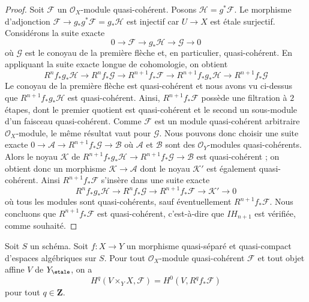 \begin{proof}
\medskip\noindent
Soit $\mathcal{F}$ un $\mathcal{O}_X$-module quasi-cohérent.
Posons $\mathcal{H} = g^*\mathcal{F}$. Le morphisme d'adjonction
$\mathcal{F} \to g_*g^*\mathcal{F} = g_*\mathcal{H}$ est injectif
car $U \to X$ est étale surjectif. Considérons la suite exacte
$$
0 \to \mathcal{F} \to g_*\mathcal{H} \to \mathcal{G} \to 0
$$
où $\mathcal{G}$ est le conoyau de la première flèche et, en particulier,
quasi-cohérent. En appliquant la suite exacte longue de cohomologie, on obtient
$$
R^nf_*g_*\mathcal{H} \to
R^nf_*\mathcal{G} \to
R^{n + 1}f_*\mathcal{F} \to
R^{n + 1}f_*g_*\mathcal{H} \to
R^{n + 1}f_*\mathcal{G}
$$
Le conoyau de la première flèche est quasi-cohérent et
nous avons vu ci-dessus que $R^{n + 1}f_*g_*\mathcal{H}$ est quasi-cohérent.
Ainsi, $R^{n + 1}f_*\mathcal{F}$ possède une filtration à $2$ étapes,
dont le premier quotient est quasi-cohérent et le second un sous-module d'un
faisceau quasi-cohérent. Comme $\mathcal{F}$ est un module quasi-cohérent arbitraire
$\mathcal{O}_X$-module, le même résultat vaut pour $\mathcal{G}$.
Nous pouvons donc choisir une suite exacte
$0 \to \mathcal{A} \to R^{n + 1}f_*\mathcal{G} \to \mathcal{B}$
où $\mathcal{A}$ et $\mathcal{B}$ sont des $\mathcal{O}_Y$-modules quasi-cohérents.
Alors le noyau $\mathcal{K}$ de
$R^{n + 1}f_*g_*\mathcal{H} \to R^{n + 1}f_*\mathcal{G}
\to \mathcal{B}$ est quasi-cohérent ; on obtient donc un morphisme
$\mathcal{K} \to \mathcal{A}$ dont le noyau $\mathcal{K}'$ est
également quasi-cohérent. Ainsi $R^{n + 1}f_*\mathcal{F}$ s'insère dans une suite
exacte
$$
R^nf_*g_*\mathcal{H} \to
R^nf_*\mathcal{G} \to
R^{n + 1}f_*\mathcal{F} \to \mathcal{K}' \to 0
$$
où tous les modules sont quasi-cohérents, sauf éventuellement $R^{n + 1}f_*\mathcal{F}$.
Nous concluons que $R^{n + 1}f_*\mathcal{F}$ est quasi-cohérent, c'est-à-dire que
$IH_{n + 1}$ est vérifiée, comme souhaité.
\end{proof}

\begin{lemma}
\label{lemma-quasi-coherence-higher-direct-images-application}
Soit $S$ un schéma. Soit $f : X \to Y$ un morphisme quasi-séparé et quasi-compact
d'espaces algébriques sur $S$. Pour tout
$\mathcal{O}_X$-module quasi-cohérent $\mathcal{F}$ et tout objet affine $V$ de
$Y_\etale$, on a
$$
H^q(V \times_Y X, \mathcal{F}) = H^0(V, R^qf_*\mathcal{F})
$$
pour tout $q \in \mathbf{Z}$.
\end{lemma}

